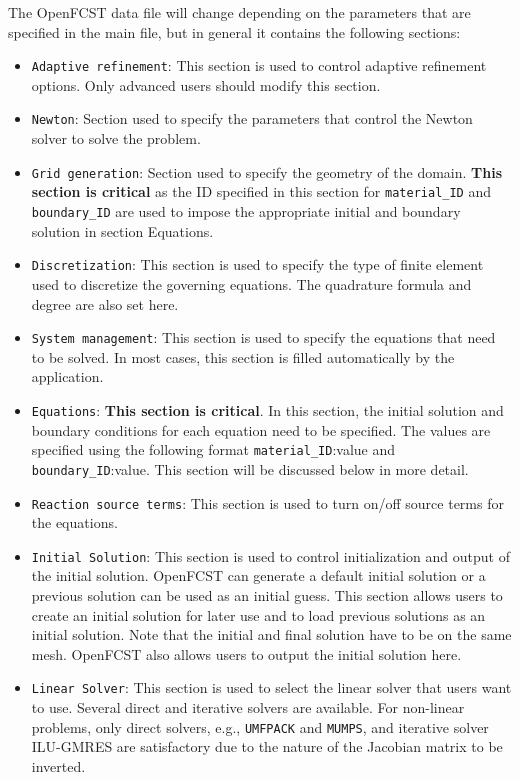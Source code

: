 The OpenFCST data file will change depending on the parameters that are specified in the main file, but in general it contains the following sections:
\begin{itemize}
 \item \texttt{Adaptive refinement}: This section is used to control adaptive refinement options. Only advanced users should modify this section.
 \item \texttt{Newton}: Section used to specify the parameters that control the Newton solver to solve the problem.
 \item \texttt{Grid generation}: Section used to specify the geometry of the domain. \textbf{This section is critical} as the ID specified in this section for \texttt{material\_ID} and \texttt{boundary\_ID} are used to impose the appropriate initial and boundary solution in section Equations. 
 \item \texttt{Discretization}: This section is used to specify the type of finite element used to discretize the governing equations. The quadrature formula and degree are also set here.
 \item \texttt{System management}: This section is used to specify the equations that need to be solved. In most cases, this section is filled automatically by the application.
 \item \texttt{Equations}: \textbf{This section is critical}. In this section, the initial solution and boundary conditions for each equation need to be specified. The values are specified using the following format \texttt{material\_ID}:value and \texttt{boundary\_ID}:value. This section will be discussed below in more detail.
 \item \texttt{Reaction source terms}: This section is used to turn on/off source terms for the equations.
 \item \texttt{Initial Solution}: This section is used to control initialization and output of the initial solution. OpenFCST can generate a default initial solution or a previous solution can be used as an initial guess. This section allows users to create an initial solution for later use and to load previous solutions as an initial solution. Note that the initial and final solution have to be on the same mesh. OpenFCST also allows users to output the initial solution here.
 \item \texttt{Linear Solver}: This section is used to select the linear solver that users want to use. Several direct and iterative solvers are available. For non-linear problems, only direct solvers, e.g., \texttt{UMFPACK} and \texttt{MUMPS}, and iterative solver ILU-GMRES are satisfactory due to the nature of the Jacobian matrix to be inverted. 

\end{itemize}
